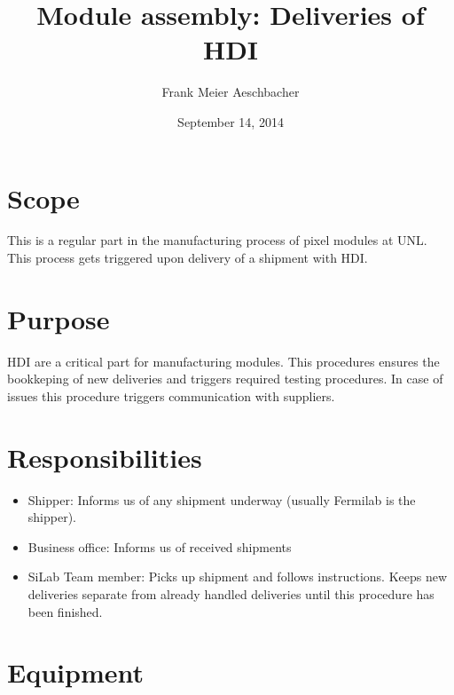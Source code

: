 \documentclass[12pt]{unlsilabsop}
\title{Module assembly: Deliveries of HDI}
\date{September 14, 2014}
\author{Frank Meier Aeschbacher}
\begin{document}
\maketitle

\section{Scope}
This is a regular part in the manufacturing process of pixel modules at UNL. This process gets triggered upon delivery of a shipment with HDI.

\section{Purpose}
HDI are a critical part for manufacturing modules. This procedures ensures the bookkeping of new deliveries and triggers required testing procedures. In case of issues this procedure triggers communication with suppliers.


\section{Responsibilities}

\begin{itemize}
    \item Shipper: Informs us of any shipment underway (usually Fermilab is the shipper).
    \item Business office: Informs us of received shipments
    \item SiLab Team member: Picks up shipment and follows instructions. Keeps new deliveries separate from already handled deliveries until this procedure has been finished.
\end{itemize}

\section{Equipment}
\end{document}
